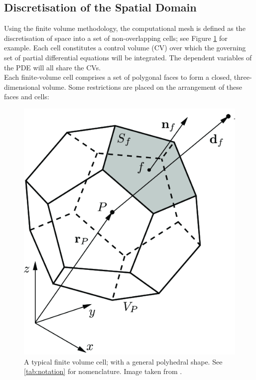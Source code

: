\documentclass[final,3p,times,twocolumn]{elsarticle}
\begin{document}
\subsection{Discretisation of the Spatial Domain}
Using the finite volume methodology, the computational mesh is defined as the discretisation of space into a set of non-overlapping cells; see Figure \ref{fig:polycell} for example. Each cell constitutes a control volume (CV) over which the governing set of partial differential equations will be integrated. The dependent variables of the PDE will all share the CVs. \\ 
Each finite-volume cell comprises a set of polygonal faces to form a closed, three-dimensional volume. Some restrictions are placed on the arrangement of these faces and cells:

\begin{figure}[ht]
    \centering
    \includegraphics[width=0.8\linewidth]{Report/images/polycell.png}
    \caption{A typical finite volume cell; with a general polyhedral shape. See \ref{tab:notation} for nomenclature. Image taken from \cite{Tukovic2018OpenfoamInteraction}.}
    \label{fig:polycell}
\end{figure}
\end{document}
